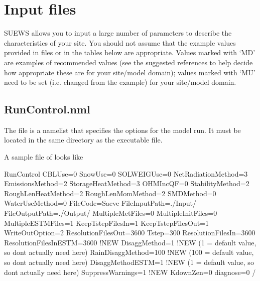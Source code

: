 \documentclass[letterpaper,10pt,english]{sphinxmanual}
\begin{document}
\chapter{Input files}
\label{\detokenize{input_files/input_files::doc}}\label{\detokenize{input_files/input_files:input-files}}\label{\detokenize{input_files/input_files:id1}}
SUEWS allows you to input a large number of parameters to describe the
characteristics of your site. You should not assume that the example
values provided in files or in the tables below are appropriate. Values
marked with ‘MD’ are examples of recommended values (see the suggested
references to help decide how appropriate these are for your site/model
domain); values marked with ‘MU’ need to be set (i.e. changed from the
example) for your site/model domain.


\section{RunControl.nml}
\label{\detokenize{input_files/RunControl/RunControl:runcontrol}}\label{\detokenize{input_files/RunControl/RunControl:runcontrol-nml}}\label{\detokenize{input_files/RunControl/RunControl::doc}}
The file  is a namelist that specifies the options for
the model run. It must be located in the same directory as the
executable file.

A sample file of  looks like

%
\begin{sphinxVerbatim}[commandchars=\\\{\}]
\PYGZam{}RunControl
CBLUse=0
SnowUse=0
SOLWEIGUse=0
NetRadiationMethod=3 
EmissionsMethod=2
StorageHeatMethod=3
OHMIncQF=0
StabilityMethod=2
RoughLenHeatMethod=2
RoughLenMomMethod=2
SMDMethod=0
WaterUseMethod=0
FileCode=\PYGZsq{}Saeve\PYGZsq{}
FileInputPath=\PYGZdq{}./Input/\PYGZdq{}
FileOutputPath=\PYGZdq{}./Output/\PYGZdq{}
MultipleMetFiles=0
MultipleInitFiles=0
MultipleESTMFiles=1
KeepTstepFilesIn=1
KeepTstepFilesOut=1
WriteOutOption=2
ResolutionFilesOut=3600
Tstep=300
ResolutionFilesIn=3600
ResolutionFilesInESTM=3600  !NEW
DisaggMethod=1          !NEW  (1 = default value, so don\PYGZsq{}t actually need here)
RainDisaggMethod=100    !NEW  (100 = default value, so don\PYGZsq{}t actually need here)
DisaggMethodESTM=1      !NEW  (1 = default value, so don\PYGZsq{}t actually need here)
SuppressWarnings=1      !NEW
KdownZen=0
diagnose=0
/
\end{sphinxVerbatim}
\end{document}
